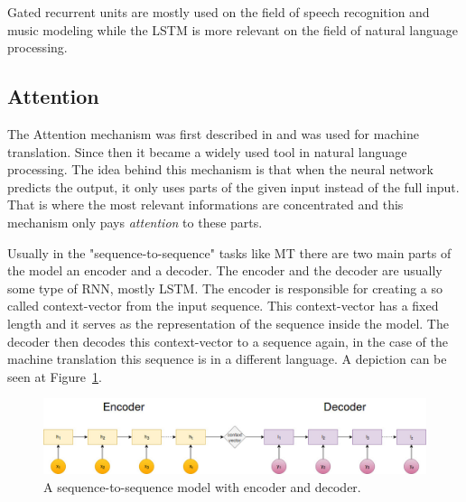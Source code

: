 Gated recurrent units are mostly used on the field of speech recognition and music modeling while the LSTM is more relevant on the field of natural language processing.

\subsection{Attention}
The Attention mechanism was first described in \cite{Bahdanau:2015} and was used for machine translation. Since then it became a widely used tool in natural language processing. The idea behind this mechanism is that when the neural network predicts the output, it only uses parts of the given input instead of the full input. That is where the most relevant informations are concentrated and this mechanism only pays \textit{attention} to these parts.

Usually in the "sequence-to-sequence" tasks like MT there are two main parts of the model an encoder and a decoder. The encoder and the decoder are usually some type of RNN, mostly LSTM. The encoder is responsible for creating a so called context-vector from the input sequence. This context-vector has a fixed length and it serves as the representation of the sequence inside the model. The decoder then decodes this context-vector to a sequence again, in the case of the machine translation this sequence is in a different language. A depiction can be seen at Figure~\ref{fig:seq_to_seq}.
\begin{figure}[!htb]
	\centering
	\includegraphics[scale=0.4]{seq_to_seq.jpg}
	\caption{A sequence-to-sequence model with encoder and decoder.}
	\label{fig:seq_to_seq}
\end{figure}

